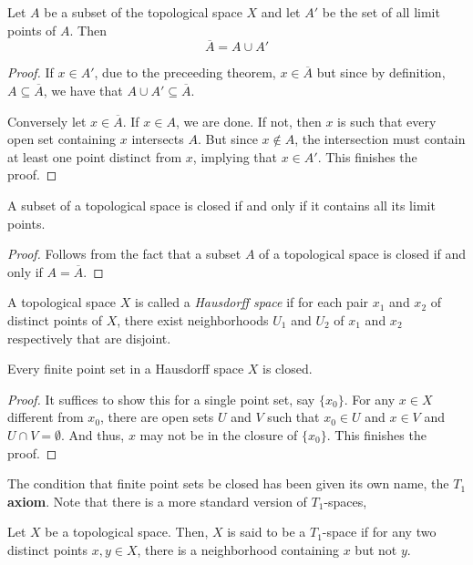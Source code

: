\begin{theorem}
    Let $A$ be a subset of the topological space $X$ and let $A'$ be the set of all limit points of $A$. Then 
    \begin{equation*}
        \overline{A} = A\cup A'
    \end{equation*}
\end{theorem}
\begin{proof}
    If $x\in A'$, due to the preceeding theorem, $x\in\overline{A}$ but since by definition, $A\subseteq\overline{A}$, we have that $A\cup A'\subseteq\overline{A}$.

    Conversely let $x\in\overline{A}$. If $x\in A$, we are done. If not, then $x$ is such that every open set containing $x$ intersects $A$. But since $x\notin A$, the intersection must contain at least one point distinct from $x$, implying that $x\in A'$. This finishes the proof.
\end{proof}
\begin{corollary}
    A subset of a topological space is closed if and only if it contains all its limit points.
\end{corollary}
\begin{proof}
    Follows from the fact that a subset $A$ of a topological space is closed if and only if $A = \overline{A}$.
\end{proof}

\begin{definition}
    A topological space $X$ is called a \textit{Hausdorff space} if for each pair $x_1$ and $x_2$ of distinct points of $X$, there exist neighborhoods $U_1$ and $U_2$ of $x_1$ and $x_2$ respectively that are disjoint.
\end{definition}

\begin{theorem}
    Every finite point set in a Hausdorff space $X$ is closed.
\end{theorem}
\begin{proof}
    It suffices to show this for a single point set, say $\{x_0\}$. For any $x\in X$ different from $x_0$, there are open sets $U$ and $V$ such that $x_0\in U$ and $x\in V$ and $U\cap V=\emptyset$. And thus, $x$ may not be in the closure of $\{x_0\}$. This finishes the proof.
\end{proof}

The condition that finite point sets be closed has been given its own name, the \textbf{$T_1$ axiom}. Note that there is a more standard version of $T_1$-spaces, 
\begin{definition}[$T_1$-space]
    Let $X$ be a topological space. Then, $X$ is said to be a $T_1$-space if for any two distinct points $x,y\in X$, there is a neighborhood containing $x$ but not $y$.
\end{definition}

